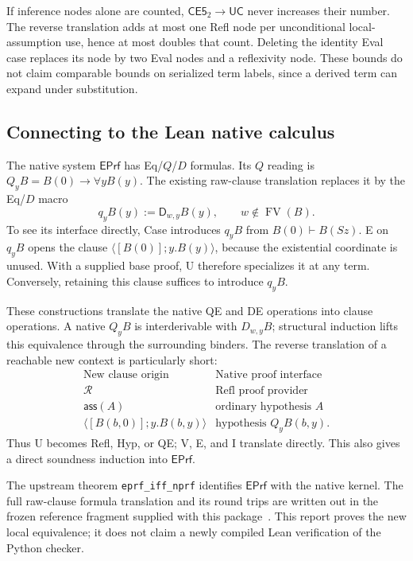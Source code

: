 \documentclass[11pt,letterpaper]{article}
\theoremstyle{definition}\newtheorem{definition}[theorem]{Definition}
\newcommand{\UC}{\mathsf{UC}}
\newcommand{\CEtwo}{\mathsf{CE5}_2}
\newcommand{\E}{\mathsf{EPrf}}
\newcommand{\D}{\mathsf D}
\newcommand{\cl}[2]{\langle #1;#2\rangle}
\newcommand{\ass}[1]{\mathsf{ass}(#1)}
\newcommand{\FV}{\operatorname{FV}}
\begin{document}
If inference nodes alone are counted, $\CEtwo\to\UC$ never increases
their number. The reverse translation adds at most one Refl node per
unconditional local-assumption use, hence at most doubles that count.
Deleting the identity Eval case replaces its node by two Eval nodes and a
reflexivity node. These bounds do not claim comparable bounds on serialized
term labels, since a derived term can expand under substitution.

\subsection{Connecting to the Lean native calculus}

The native system $\E$ has Eq/$Q$/$D$ formulas. Its $Q$ reading is
$Q_yB=B(0)\to\forall yB(y)$. The existing raw-clause translation replaces
it by the Eq/$D$ macro
\[
                    q_yB(y):=\D_{w,y}B(y),
                    \qquad w\notin\FV(B).                \tag{q}
\]
To see its interface directly, Case introduces $q_yB$ from
$B(0)\vdash B(Sz)$. E on $q_yB$ opens the clause
$\cl{[B(0)]}{y.B(y)}$, because the existential coordinate is unused.
With a supplied base proof, U therefore specializes it at any term.
Conversely, retaining this clause suffices to introduce $q_yB$.

These constructions translate the native QE and DE operations into clause
operations. A native $Q_yB$ is interderivable with $D_{w,y}B$; structural
induction lifts this equivalence through the surrounding binders. The
reverse translation of a reachable new context is particularly short:
\[
\begin{array}{c|c}
\text{New clause origin}&\text{Native proof interface}\\ \hline
\mathcal R&\text{Refl proof provider}\\
\ass A&\text{ordinary hypothesis }A\\
\cl{[B(b,0)]}{y.B(b,y)}&\text{hypothesis }Q_yB(b,y).
\end{array}
\]
Thus U becomes Refl, Hyp, or QE; V, E, and I translate directly. This
also gives a direct soundness induction into $\E$.

The upstream theorem \texttt{eprf\_iff\_nprf} identifies $\E$ with the
native kernel. The full raw-clause formula translation and its round trips
are written out in the frozen reference fragment supplied with this
package~\cite{raw}. This report proves the new local equivalence; it does
not claim a newly compiled Lean verification of the Python checker.
\end{document}
